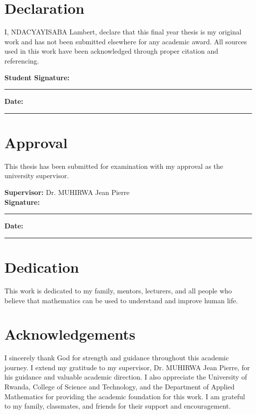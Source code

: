 \documentclass[12pt,a4paper,oneside]{report}
\begin{document}
\chapter*{Declaration}
I, NDACYAYISABA Lambert, declare that this final year thesis is my original work and has not been submitted elsewhere for any academic award. All sources used in this work have been acknowledged through proper citation and referencing.

\vspace{1.2cm}
\noindent\textbf{Student Signature:} \rule{6cm}{0.4pt}\hfill\textbf{Date:} \rule{3.5cm}{0.4pt}

\chapter*{Approval}
This thesis has been submitted for examination with my approval as the university supervisor.

\vspace{1.2cm}
\noindent\textbf{Supervisor:} Dr. MUHIRWA Jean Pierre\\[8pt]
\textbf{Signature:} \rule{6cm}{0.4pt}\hfill\textbf{Date:} \rule{3.5cm}{0.4pt}

\chapter*{Dedication}
This work is dedicated to my family, mentors, lecturers, and all people who believe that mathematics can be used to understand and improve human life.

\chapter*{Acknowledgements}
I sincerely thank God for strength and guidance throughout this academic journey. I extend my gratitude to my supervisor, Dr. MUHIRWA Jean Pierre, for his guidance and valuable academic direction. I also appreciate the University of Rwanda, College of Science and Technology, and the Department of Applied Mathematics for providing the academic foundation for this work. I am grateful to my family, classmates, and friends for their support and encouragement.
\end{document}
